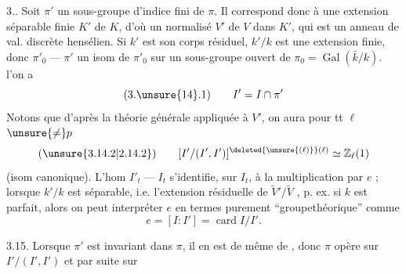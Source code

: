 
3.. Soit $\pi'$ un sous-groupe d'indice fini de $\pi$. Il correspond donc à une extension séparable finie $K'$ de $K$, d'où un normalisé $V'$ de $V$ dans $K'$, qui est un anneau de val. discrète hensélien. Si $k'$ est son corps résiduel, $k'/k$ est une extension finie, donc $\pi'_0\mathrel{\text{---}}\pi'$   un isom de $\pi'_0$  sur un sous-groupe ouvert de $\pi_0=\operatorname{Gal}(\bar k/k)$.   l'on a 
\[
(3.\unsure{14}.1)\qquad I'=I\cap\pi'
\]
Notons que d'après la théorie générale appliquée à $V'$, on aura pour tt $\ell$  $\unsure{\ne}p$
\[
(\unsure{3.14.2|2.14.2})\qquad [I'/(I',I')]^{\deleted{\unsure{(\ell)}}(\ell)}\simeq\mathbb Z_\ell(1)
\]
(isom canonique).  L'hom $I'_t\mathrel{\text{---}}I_t$ s'identifie, sur $I_t$, à la multiplication par $e$ ;  lorsque $k'/k$ est séparable,  i.e. l'extension résiduelle de $\widetilde V'/\widetilde V$  ,  p. ex. si $k$ est parfait, alors on peut interpréter $e$ en termes purement ``groupethéorique'' comme
\[
 e=[I:I']=\operatorname{card}I/I'.
\]


3.15. Lorsque $\pi'$ est invariant dans $\pi$,  il en est de même de  , donc   $\pi$ opère sur $I'/(I',I')$ \unsure{,} et par suite sur
